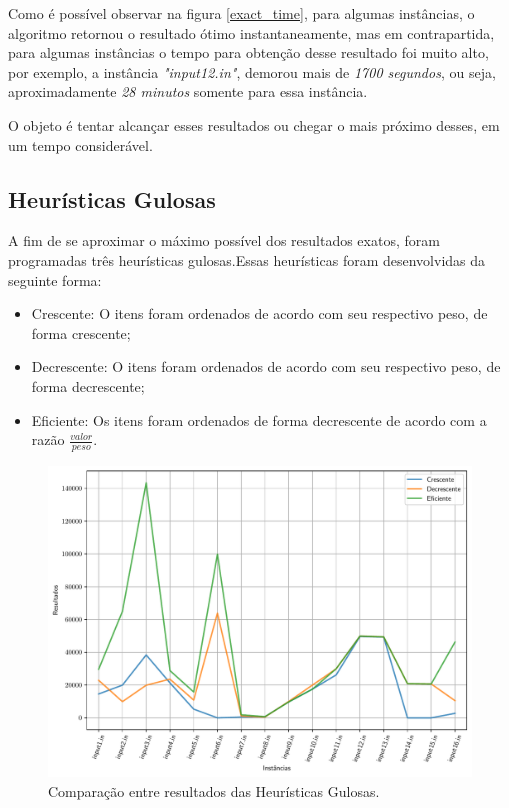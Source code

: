\documentclass[a4paper, 12pt]{article}
\begin{document}
Como é possível observar na figura \ref{exact_time}, para algumas instâncias, o algoritmo retornou
o resultado ótimo instantaneamente, mas em contrapartida, para algumas instâncias o
tempo para obtenção desse resultado foi muito alto, por exemplo, a instância \textit{"input12.in"},
demorou mais de \textit{1700 segundos}, ou seja, aproximadamente \textit{28 minutos} somente para essa instância.

O objeto é tentar alcançar esses resultados ou chegar o mais próximo desses, em um tempo considerável.

\newpage
\subsection{Heurísticas Gulosas}
A fim de se aproximar o máximo possível dos resultados exatos, foram programadas três heurísticas gulosas.Essas heurísticas foram desenvolvidas da seguinte forma:
\begin{itemize}
    \item \footnotesize{Crescente: O itens foram ordenados de acordo com seu respectivo peso, de forma crescente;} 
    \item \footnotesize{Decrescente: O itens foram ordenados de acordo com seu respectivo peso, de forma decrescente;}
    \item \footnotesize{Eficiente: Os itens foram ordenados de forma decrescente de acordo com a razão $\frac{valor}{peso}$.}
\end{itemize}

\begin{figure}[!htb]
    \centering
    \includegraphics[width=0.8\linewidth]{../imgs/greedy_compare.pdf}
    \caption{Comparação entre resultados das Heurísticas Gulosas.}
    \label{greedy_compare}
\end{figure}
\end{document}
